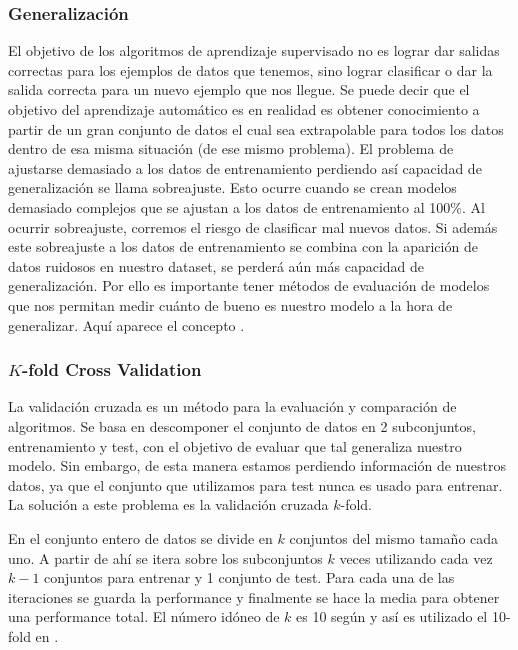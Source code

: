 \subsubsection{Generalización}
El objetivo de los algoritmos de aprendizaje supervisado no es lograr dar salidas correctas para los ejemplos de datos que tenemos, sino lograr clasificar o dar la salida correcta para un nuevo ejemplo que nos llegue. Se puede decir que el objetivo del aprendizaje automático es en realidad es obtener conocimiento a partir de un gran conjunto de datos el cual sea extrapolable para todos los datos dentro de esa misma situación (de ese mismo problema).
El problema de ajustarse demasiado a los datos de entrenamiento perdiendo así capacidad de generalización se llama sobreajuste. Esto ocurre cuando se crean modelos demasiado complejos que se ajustan a los datos de entrenamiento al 100\%. Al ocurrir sobreajuste, corremos el riesgo de clasificar mal nuevos datos. Si además este sobreajuste a los datos de entrenamiento se combina con la aparición de datos ruidosos en nuestro dataset, se perderá aún más capacidad de generalización. Por ello es importante tener métodos de evaluación de modelos que nos permitan medir cuánto de bueno es nuestro modelo a la hora de generalizar. Aquí aparece el concepto .

\subsubsection{$K$-fold Cross Validation \cite{CrossVal}}
La validación cruzada es un método para la evaluación y comparación de algoritmos. Se basa en descomponer el conjunto de datos en 2 subconjuntos, entrenamiento y test, con el objetivo de evaluar que tal generaliza nuestro modelo. Sin embargo, de esta manera estamos perdiendo información de nuestros datos, ya que el conjunto que utilizamos para test nunca es usado para entrenar. La solución a este problema es la validación cruzada $k$-fold.

En  el conjunto entero de datos se divide en $k$ conjuntos del mismo tamaño cada uno. A partir de ahí se itera sobre los subconjuntos $k$ veces utilizando cada vez $k-1$ conjuntos para entrenar y 1 conjunto de test. Para cada una de las iteraciones se guarda la performance y finalmente se hace la media para obtener una performance total. El número idóneo de $k$ es 10 según \cite{CrossVal} y así es utilizado el 10-fold en \cite{Orz2016}.


